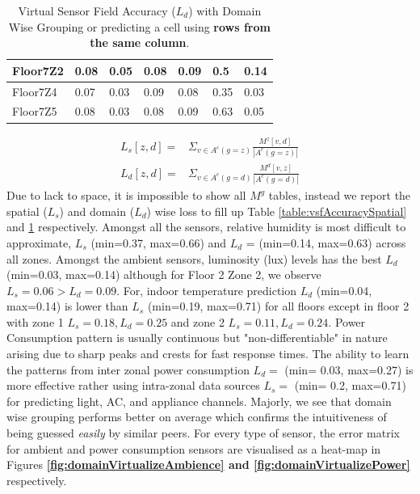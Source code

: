 \begin{table}[]
\begin{tabular}{|l|l|l|l|l|l|l|}
Floor7Z2 & 0.08                     & 0.05                             & 0.08                          & 0.09                         & 0.5                           & 0.14                            \\ \hline
Floor7Z4 & 0.07                     & 0.03                             & 0.09                          & 0.08                         & 0.35                          & 0.03                            \\ \hline
Floor7Z5 & 0.08                     & 0.03                             & 0.08                          & 0.09                         & 0.63                          & 0.05                            \\ \hline

\end{tabular}
\caption{Virtual Sensor Field Accuracy ($L_d$) with Domain Wise Grouping or predicting a cell using \textbf{rows from the same column}.}
\label{table:vsfAccuracyDomain}
\end{table}

\begin{equation}\begin{matrix}
L_s [z,d] = & \Sigma_{v \in A^c(g=z)} \frac{M^z[v,d]}{|A^c(g=z)|}  \\
L_d [z,d] = & \Sigma_{v \in A^c(g=d)} \frac{M^d[v,z]}{|A^c(g=d)|} 
\end{matrix}
\end{equation}
Due to lack to space, it is impossible to show all $M^g$ tables, instead we report the spatial ($L_s$) and domain ($L_d$) wise loss to fill up Table \ref{table:vsfAccuracySpatial} and \ref{table:vsfAccuracyDomain} respectively.
Amongst all the sensors, relative humidity is most difficult to approximate,  $L_s$ (min=0.37, max=0.66) and $L_d$ = (min=0.14, max=0.63)  across all zones.
Amongst the ambient sensors, luminosity (lux) levels has the best $L_d$  (min=0.03, max=0.14) although for Floor 2 Zone 2, we observe $L_s=0.06 > L_d = 0.09$.  
For, indoor temperature prediction $L_d$  (min=0.04, max=0.14)  is lower than $L_s$ (min=0.19, max=0.71) for all floors except in floor 2 with zone 1 $L_s = 0.18, L_d=0.25$ and zone 2 $L_s = 0.11, L_d = 0.24 $.
Power Consumption pattern is usually continuous but "non-differentiable" in nature arising due to sharp peaks and crests for fast response times.  
The ability to learn the patterns from inter zonal power consumption $L_d =$ (min= 0.03, max=0.27)  is more effective rather using intra-zonal data sources  $L_s =$ (min= 0.2, max=0.71)   for predicting light, AC, and appliance channels.
Majorly, we see that domain wise grouping performs better on average which confirms the intuitiveness of being guessed \textit{easily} by similar peers.
For every type of sensor, the error matrix for ambient and power consumption sensors are visualised as a heat-map in Figures \textbf{\ref{fig:domainVirtualizeAmbience} and \ref{fig:domainVirtualizePower}} respectively.

